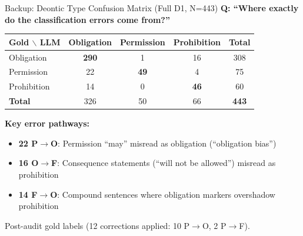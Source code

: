 \documentclass[aspectratio=169, 10pt]{beamer}
\begin{document}
\begin{frame}{Backup: Deontic Type Confusion Matrix (Full D1, N=443)}
    \textbf{Q: ``Where exactly do the classification errors come from?''}

    \vspace{0.3cm}
    \begin{table}[]
        \centering
        \begin{tabular}{l|ccc|c}
            \toprule
            \textbf{Gold $\backslash$ LLM} & \textbf{Obligation} & \textbf{Permission} & \textbf{Prohibition} & \textbf{Total} \\
            \midrule
            Obligation   & \textbf{290} & 1  & 16 & 308 \\
            Permission   & 22  & \textbf{49} & 4  & 75 \\
            Prohibition  & 14  & 0  & \textbf{46} & 60 \\
            \midrule
            \textbf{Total} & 326 & 50 & 66 & \textbf{443} \\
            \bottomrule
        \end{tabular}
    \end{table}

    \vspace{0.3cm}
    \textbf{Key error pathways:}
    \begin{itemize}
        \item \textbf{22 P$\rightarrow$O}: Permission ``may'' misread as obligation (``obligation bias'')
        \item \textbf{16 O$\rightarrow$F}: Consequence statements (``will not be allowed'') misread as prohibition
        \item \textbf{14 F$\rightarrow$O}: Compound sentences where obligation markers overshadow prohibition
    \end{itemize}

    \vspace{0.2cm}
    \footnotesize Post-audit gold labels (12 corrections applied: 10 P$\to$O, 2 P$\to$F).
\end{frame}
\end{document}

